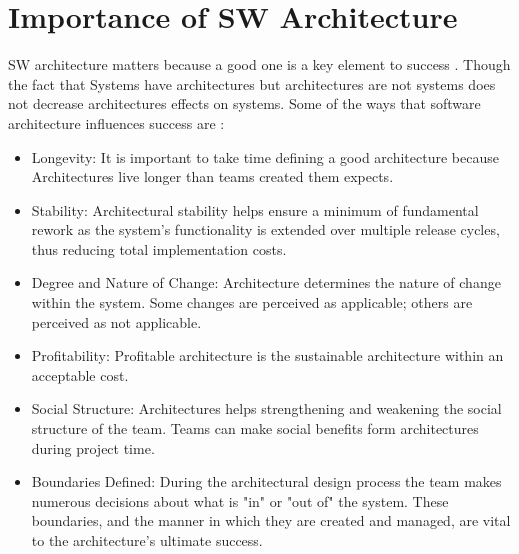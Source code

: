 \documentclass[12pt,a4paper,final,twoside,onecolumn,titlepage]{book}
\begin{document}
\section{Importance of SW Architecture}
\gls{SW} architecture matters because a good one is a key element to success \cite{M07}. Though the fact that Systems have architectures but architectures are not systems \cite{W26} does not decrease architectures effects on systems. Some of the ways that software architecture influences success are \cite{M07}:
\begin{itemize}
\item Longevity: It is important to take time defining a good architecture because Architectures live longer than teams created them expects.
\item Stability: Architectural stability helps ensure a minimum of fundamental rework as the system's functionality is extended over multiple release cycles, thus reducing total implementation costs.
\item Degree and Nature of Change: Architecture determines the nature of change within the system. Some changes are perceived as applicable; others are perceived as not applicable.
\item Profitability: Profitable architecture is the sustainable architecture within an acceptable cost.
\item Social Structure: Architectures helps strengthening and weakening the social structure of the team. Teams can make social benefits form architectures during project time.
\item Boundaries Defined: During the architectural design process the team makes numerous decisions about what is "in" or "out of" the system. These boundaries, and the manner in which they are created and managed, are vital to the architecture's ultimate success.
\end{itemize}
\end{document}
